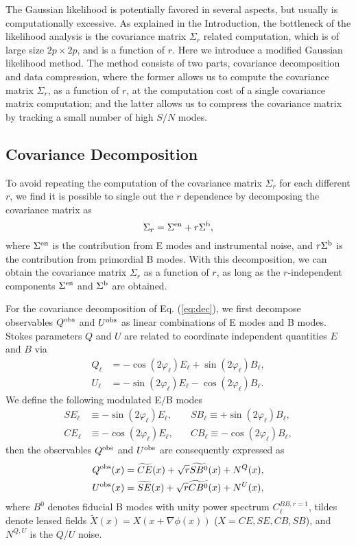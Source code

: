 \documentclass[aps, prd, reprint, nofootinbib, groupedaddress, showpacs]{revtex4-1}
\def\be{\begin{equation}}
\def\ee{\end{equation}}
\newcommand*\Bell{\ensuremath{\boldsymbol\ell}}
\begin{document}
The Gaussian likelihood is potentially favored in several aspects,
but usually is computationally excessive.
As explained in the Introduction, the bottleneck of the likelihood analysis is
the covariance matrix $\Sigma_r$ related computation,
which is of large size $2p\times 2p$, and is a function of $r$.
Here we introduce a modified Gaussian likelihood method.
The method consists of two parts, covariance decomposition and data compression,
where the former allows us to compute the covariance matrix $\Sigma_r$,
as a function of $r$, at the computation cost of a single covariance matrix computation;
and the latter allows us to compress the covariance matrix
by tracking a small number of high $S/N$ modes.

\subsection{Covariance Decomposition}
To avoid repeating the computation of the covariance matrix $\Sigma_r$ for each different $r$,
we find it is possible to single out the $r$ dependence by decomposing the  covariance matrix as
\be
\label{eq:dec}
\Sigma_r = \Sigma^{\rm en} + r \Sigma^{\rm b},
\ee
where $\Sigma^{\rm en}$ is the contribution from E modes and instrumental noise,
and $r \Sigma^{\rm b}$ is the contribution from primordial B modes.
With this decomposition, we can obtain the covariance matrix $\Sigma_r$ as a function
of $r$, as long as the $r$-independent components $\Sigma^{\rm en}$ and  $\Sigma^{\rm b}$ are obtained.

For the covariance decomposition of Eq. (\ref{eq:dec}),
we first decompose observables $Q^{\rm obs}$ and $U^{\rm obs}$ as linear combinations of E modes and B modes.
Stokes parameters $Q$ and $U$ are related to coordinate independent quantities $E$ and $B$ via
\citep{Stebbins1996, Kamionkowski1997a, Kamionkowski1997, Seljak1997a}
\be
\label{eq:queb}
\begin{aligned}
Q_{\Bell} &= - \cos(2\varphi_{\Bell}) E_{\Bell} + \sin(2\varphi_{\Bell}) B_{\Bell}, \\
U_{\Bell} &= - \sin(2\varphi_{\Bell}) E_{\Bell} - \cos(2\varphi_{\Bell}) B_{\Bell}.
\end{aligned}
\ee
We define the following modulated E/B modes
\be
\begin{aligned}
SE_{\Bell} & \equiv - \sin(2\varphi_{\Bell}) E_{\Bell}, \quad  & SB_{\Bell}  \equiv +\sin(2\varphi_{\Bell}) B_{\Bell},\\
CE_{\Bell} & \equiv - \cos(2\varphi_{\Bell}) E_{\Bell}, \quad  & CB_{\Bell} \equiv -\cos(2\varphi_{\Bell}) B_{\Bell},
\end{aligned}
\ee
then the observables $Q^{\rm obs}$ and $U^{\rm obs}$ are consequently expressed as
\be
\begin{aligned}
Q^{\rm obs}(x) &= \widetilde{CE}(x) + \sqrt{r} \widetilde{SB^0}(x) + N^Q(x),\\
U^{\rm obs}(x) &= \widetilde{SE}(x) + \sqrt{r} \widetilde{CB^0}(x) + N^U(x),
\end{aligned}
\ee
where $B^0$ denotes fiducial B modes with unity power spectrum $C_\ell^{BB,r=1}$,
tildes denote lensed fields $\widetilde X(x) = X(x+\nabla\phi(x))$ ($X = CE, SE, CB, SB$),
and $N^{Q,U}$ is the $Q/U$ noise.
\end{document}
